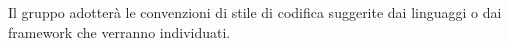 Il gruppo \Gruppo{} adotter\`{a} le convenzioni di stile di codifica suggerite dai linguaggi o dai framework che verranno individuati.